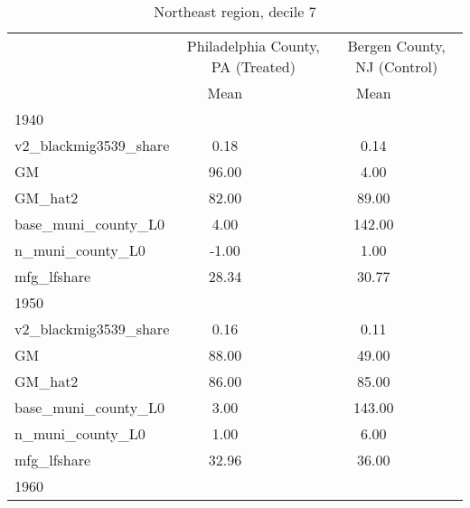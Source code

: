 \begin{table}[htbp]\centering
\def\sym#1{\ifmmode^{#1}\else\(^{#1}\)\fi}
\caption{Northeast region, decile 7 \label{tab1}}
\begin{tabular}{l*{2}{ccc}}
\toprule
                    &\multicolumn{3}{c}{Philadelphia County, PA (Treated)}&\multicolumn{3}{c}{Bergen County, NJ (Control)}\\
                    &        Mean&            &            &        Mean&            &            \\
\midrule
1940                &            &            &            &            &            &            \\
v2\_blackmig3539\_share&        0.18&            &            &        0.14&            &            \\
GM                  &       96.00&            &            &        4.00&            &            \\
GM\_hat2             &       82.00&            &            &       89.00&            &            \\
base\_muni\_county\_L0 &        4.00&            &            &      142.00&            &            \\
n\_muni\_county\_L0    &       -1.00&            &            &        1.00&            &            \\
mfg\_lfshare         &       28.34&            &            &       30.77&            &            \\
\midrule
1950                &            &            &            &            &            &            \\
v2\_blackmig3539\_share&        0.16&            &            &        0.11&            &            \\
GM                  &       88.00&            &            &       49.00&            &            \\
GM\_hat2             &       86.00&            &            &       85.00&            &            \\
base\_muni\_county\_L0 &        3.00&            &            &      143.00&            &            \\
n\_muni\_county\_L0    &        1.00&            &            &        6.00&            &            \\
mfg\_lfshare         &       32.96&            &            &       36.00&            &            \\
\midrule
1960                &            &            &            &            &            &            \\

\end{tabular}
\end{table}
